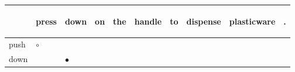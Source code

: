 \documentclass[landscape]{article}
\newcommand{\ssp}{\hspace{2pt}}
\newcommand{\mex}{\cellcolor{g}$\bullet$}
\newcommand{\map}{\cellcolor{y}$\boldsymbol\circ$}
\begin{document}
\noindent\begin{tabular}{|l|p{10pt}|p{10pt}|p{10pt}|p{10pt}|p{10pt}|p{10pt}|p{10pt}|p{10pt}|p{10pt}|}
\hline
&\begin{sideways}\cellcolor{ref0}press\hspace{12pt}\end{sideways}&\begin{sideways}\cellcolor{ref1}down\hspace{12pt}\end{sideways}&\begin{sideways}\cellcolor{ref2}on\hspace{12pt}\end{sideways}&\begin{sideways}\cellcolor{ref3}the\hspace{12pt}\end{sideways}&\begin{sideways}\cellcolor{ref4}handle\hspace{12pt}\end{sideways}&\begin{sideways}\cellcolor{ref5}to\hspace{12pt}\end{sideways}&\begin{sideways}\cellcolor{ref6}dispense\hspace{12pt}\end{sideways}&\begin{sideways}\cellcolor{ref7}plasticware\hspace{12pt}\end{sideways}&\begin{sideways}\cellcolor{ref8}.\hspace{12pt}\end{sideways}\\
\hline
\ssp \cellcolor{ref0}push \ssp&\hspace{2pt}\map&\hspace{2pt}&\hspace{2pt}&\hspace{2pt}&\hspace{2pt}&\hspace{2pt}&\hspace{2pt}&\hspace{2pt}&\hspace{2pt}\\
\hline
\ssp \cellcolor{ref1}down \ssp&\hspace{2pt}&\hspace{2pt}\mex&\hspace{2pt}&\hspace{2pt}&\hspace{2pt}&\hspace{2pt}&\hspace{2pt}&\hspace{2pt}&\hspace{2pt}\\

\end{tabular}
\end{document}
